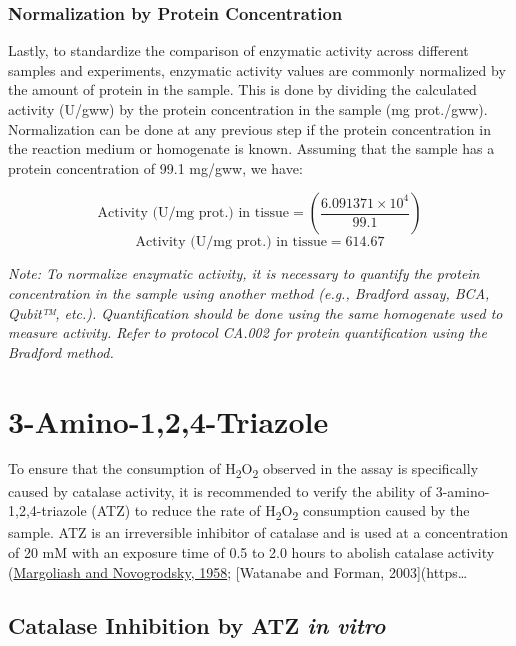 \documentclass[
  9pt,
  american,
  a5paper,
  extrafontsizes,onecolumn,openright
  ]{memoir}
\begin{document}
\subsubsection{Normalization by Protein Concentration}\label{normalization-by-protein-concentration}

Lastly, to standardize the comparison of enzymatic activity across different samples and experiments, enzymatic activity values are commonly normalized by the amount of protein in the sample. This is done by dividing the calculated activity (U/gww) by the protein concentration in the sample (mg prot./gww). Normalization can be done at any previous step if the protein concentration in the reaction medium or homogenate is known. Assuming that the sample has a protein concentration of 99.1 mg/gww, we have:

\[ \text{Activity (U/mg prot.) in tissue} = \left( \frac{\ensuremath{6.091371\times 10^{4}}}{99.1} \right)\]
\[ \text{Activity (U/mg prot.) in tissue} = 614.67 \]

\emph{Note: To normalize enzymatic activity, it is necessary to quantify the protein concentration in the sample using another method (e.g., Bradford assay, BCA, Qubit™, etc.). Quantification should be done using the same homogenate used to measure activity. Refer to protocol CA.002 for protein quantification using the Bradford method.}

\section{3-Amino-1,2,4-Triazole}\label{amino-124-triazole}

To ensure that the consumption of H\textsubscript{2}O\textsubscript{2} observed in the assay is specifically caused by catalase activity, it is recommended to verify the ability of 3-amino-1,2,4-triazole (ATZ) to reduce the rate of H\textsubscript{2}O\textsubscript{2} consumption caused by the sample. ATZ is an irreversible inhibitor of catalase and is used at a concentration of 20 mM with an exposure time of 0.5 to 2.0 hours to abolish catalase activity (\href{https://doi.org/10.1042\%2Fbj0680468}{Margoliash and Novogrodsky, 1958}; {[}Watanabe and Forman, 2003{]}(https\ldots{}

\subsection{\texorpdfstring{Catalase Inhibition by ATZ \emph{in vitro}}{Catalase Inhibition by ATZ in vitro}}\label{catalase-inhibition-by-atz-in-vitro}
\end{document}
